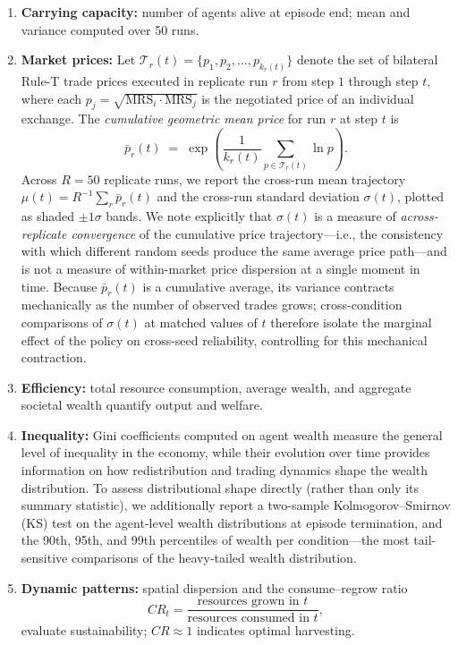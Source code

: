 \documentclass[pdflatex,sn-mathphys-num]{sn-jnl}%
\theoremstyle{thmstyleone}%
\theoremstyle{thmstyletwo}%
\theoremstyle{thmstylethree}%
\begin{document}
\begin{enumerate}
\item \textbf{Carrying capacity:} number of agents alive at episode end; mean and variance computed over 50 runs.  
\item \textbf{Market prices:} Let $\mathcal{T}_r(t) = \{p_1, p_2, \ldots, p_{k_r(t)}\}$ denote the set of bilateral Rule-T trade prices executed in replicate run $r$ from step $1$ through step $t$, where each $p_j = \sqrt{\text{MRS}_i \cdot \text{MRS}_j}$ is the negotiated price of an individual exchange.  
The \emph{cumulative geometric mean price} for run $r$ at step $t$ is
\[
\bar{p}_r(t) \;=\; \exp\!\left(\frac{1}{k_r(t)} \sum_{p \in \mathcal{T}_r(t)} \ln p\right).
\]
Across $R = 50$ replicate runs, we report the cross-run mean trajectory $\mu(t) = R^{-1}\sum_r \bar{p}_r(t)$ and the cross-run standard deviation $\sigma(t)$, plotted as shaded $\pm 1\sigma$ bands.  
We note explicitly that $\sigma(t)$ is a measure of \emph{across-replicate convergence} of the cumulative price trajectory---i.e., the consistency with which different random seeds produce the same average price path---and is not a measure of within-market price dispersion at a single moment in time.  
Because $\bar{p}_r(t)$ is a cumulative average, its variance contracts mechanically as the number of observed trades grows; cross-condition comparisons of $\sigma(t)$ at matched values of $t$ therefore isolate the marginal effect of the policy on cross-seed reliability, controlling for this mechanical contraction.
\item \textbf{Efficiency:} total resource consumption, average wealth, and aggregate societal wealth quantify output and welfare.  
\item \textbf{Inequality:} Gini coefficients computed on agent wealth measure the general level of inequality in the economy, while their evolution over time provides information on how redistribution and trading dynamics shape the wealth distribution. To assess distributional shape directly (rather than only its summary statistic), we additionally report a two-sample Kolmogorov--Smirnov (KS) test on the agent-level wealth distributions at episode termination, and the 90th, 95th, and 99th percentiles of wealth per condition---the most tail-sensitive comparisons of the heavy-tailed wealth distribution.
\item \textbf{Dynamic patterns:} spatial dispersion and the consume--regrow ratio
\[
CR_t=\frac{\text{resources grown in }t}{\text{resources consumed in }t},
\]
evaluate sustainability; \(CR\approx1\) indicates optimal harvesting.
\end{enumerate}
\end{document}
